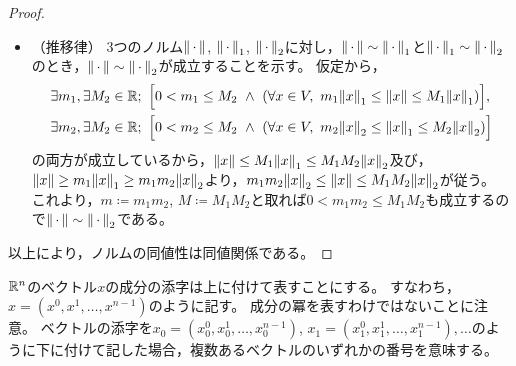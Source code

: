 \documentclass[b5paper,draft]{ltjsbook}
\begin{document}
\begin{prop}
\begin{proof}
\begin{itemize}
            \item （推移律）
            3つのノルム$\norm{\dummy}$, $\norm{\dummy}_1$, $\norm{\dummy}_2$に対し，$\norm{\dummy}\sim \norm{\dummy}_1$と$\norm{\dummy}_1\sim \norm{\dummy}_2$のとき，$\norm{\dummy}\sim \norm{\dummy}_2$が成立することを示す。
            仮定から，
            \begin{align}
                &\exists m_1, \exists M_2\in\R;\ \bsqu{0<m_1\leq M_2\ \land \ \pare{
                \forall x\in V,\ m_1\norm{x}_1 \leq \norm{x} \leq M_1\norm{x}_1
                }},
                \\
                &\exists m_2, \exists M_2\in\R;\ \bsqu{0<m_2\leq M_2\ \land \ \pare{
                \forall x\in V,\ m_2\norm{x}_2 \leq \norm{x}_1 \leq M_2\norm{x}_2
                }}
            \end{align}
            の両方が成立しているから，$\norm{x}\leq M_1\norm{x}_1\leq M_1M_2\norm{x}_2$及び，$\norm{x}\geq m_1\norm{x}_1\geq m_1m_2 \norm{x}_2$より，$m_1m_2\norm{x}_2\leq \norm{x}\leq M_1M_2\norm{x}_2$が従う。
            これより，$m\coloneqq m_1m_2$, $M\coloneqq M_1M_2$と取れば$0<m_1m_2\leq M_1M_2$も成立するので$\norm{\dummy}\sim \norm{\dummy}_2$である。
        \end{itemize}

        以上により，ノルムの同値性は同値関係である。
    \end{proof}
\end{prop}

\begin{nota}[上添字]
    $\mathbb{R}^n$のベクトル$x$の成分の添字は上に付けて表すことにする。
    すなわち，$x=(x^0,x^1,\dots,x^{n-1})$のように記す。
    成分の冪を表すわけではないことに注意。
    ベクトルの添字を$x_0=(x^0_0,x^1_0,\dots,x^{n-1}_0)$, $x_1=(x^0_1,x^1_1,\dots,x^{n-1}_1),\dots$のように下に付けて記した場合，複数あるベクトルのいずれかの番号を意味する。
\end{nota}
\end{document}
